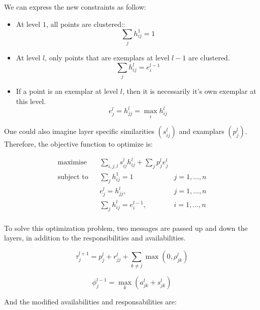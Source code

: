 \documentclass{ipol}
\begin{document}
We can express the new constraints as follow:

\begin{itemize}
\item At level $1$, all points are clustered::
\begin{equation}
\sum_{j} h_{ij}^1 = 1
\end{equation}
\item At level $l$, only points that are exemplars at level $l - 1$ are
clustered.
\begin{equation}
\sum_{j} h_{ij}^l = e_i^{l-1}
\end{equation}

\item If a point is an exemplar at level $l$, then it is necessarily it's own
exemplar at this level.
\begin{equation}
e_j^l = h_{jj}^l = \max_i h_{ij}^l
\end{equation}
\end{itemize}

One could also imagine layer specific similarities $(s^l_{ij})$ and examplars
$(p^l_j)$. Therefore, the objective function to optimize is:

\begin{equation*}
\renewcommand{\arraystretch}{2}
\begin{array}{ccll}
\text{maximise} & & \sum_{i, j, l} s^l_{ij} h^l_{ij} + \sum_{j} p^l_j e^l_j \\
\text{subject to} &  & \sum_{j} h_{ij}^1 = 1 & j = 1, \dots, n\\
		  &  & e^l_{j} = h^l_{jj}, & j = 1, \dots, n\\
		  &  & \sum_{j} h_{ij}^l = e_i^{l-1}, & i = 1, \dots, n\\

\end{array}
\end{equation*}

To solve this optimization problem, two messages are passed up and down the
layers, in addition to the responsibilities and availabilities.

\begin{equation}
\tau_j^{l + 1} = p^l_j + r_{jj}^l + \sum_{k \neq j} \max (0, \rho^l_{jk})
\end{equation}

\begin{equation}
\phi_j^{l - 1} = \max_k (a_{jk}^l + s_{jk}^l)
\end{equation}

And the modified availabilities and responsabilities are:
\end{document}
